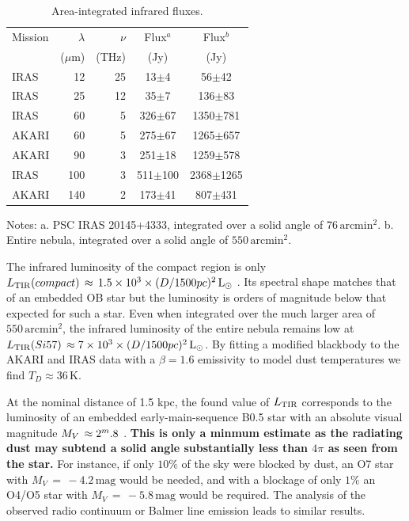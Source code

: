 \documentclass{aa}
\begin{document}
\begin{table}
\caption{Area-integrated infrared fluxes.}
   \label{table:IR_luminosities}
\begin{center}
\begin{tabular}{lrrcc}
\toprule
Mission& $\lambda$ & $\nu$ & Flux$^{a}$   & Flux$^{b}$    \\
       &($\mu$m)   & (THz) & (Jy)        & (Jy)          \\
\midrule
IRAS   &        12 &    25 &  13$\pm$4   &   56$\pm$42   \\
IRAS   &        25 &    12 &  35$\pm$7   &  136$\pm$83   \\
IRAS   &        60 &     5 & 326$\pm$67  & 1350$\pm$781  \\
AKARI  &        60 &     5 & 275$\pm$67  & 1265$\pm$657  \\
AKARI  &        90 &     3 & 251$\pm$18  & 1259$\pm$578  \\
IRAS   &       100 &     3 & 511$\pm$100 & 2368$\pm$1265 \\
AKARI  &       140 &     2 & 173$\pm$41  &  807$\pm$431  \\
\bottomrule
\end{tabular}
\end{center}
Notes: a. PSC IRAS 20145+4333, integrated over a solid angle of
$76\, \mathrm{arcmin^2}$.  b. Entire nebula, integrated over
a solid angle of $550\, \mathrm{arcmin^2}$.
\end{table}

The infrared luminosity of the compact region is only
$L_{\rm TIR}(compact)\,\approx\,1.5\times 10^{3}\times(D/1500
pc)^2\, \mathrm{L_{\odot}}$ \citep[using][]{Lee_1996}.
Its spectral shape matches that of an
embedded OB star \citep{wood1989massive} but the luminosity is
orders of magnitude below that expected for such a star. Even when 
integrated over the much larger area of $550\, \mathrm{arcmin^{2}}$, 
the infrared luminosity of the entire nebula remains low at
$L_{\rm TIR}(Si57)\,\approx 7\times 10^{3}\times(D/1500
pc)^2\,\mathrm{L_{\odot}}$. By fitting a
modified blackbody \citep{battersby2011characterizing} to the AKARI
and IRAS data with a $\beta=1.6$ emissivity to model dust temperatures 
we find $T_D \approx 36\, \mathrm{K}$.

At the nominal distance of 1.5 kpc, the found value of $L_{\rm TIR}$
corresponds to the luminosity of an embedded early-main-sequence B0.5
star with an absolute visual magnitude $M_V\,\approx\-2^m.8$
\citep{1973AJ.....78..929P}.  \textbf{This is only a minmum estimate
  as the radiating dust may subtend a solid angle
  substantially less than $4\pi$ as seen from the star.}
  For instance, if only $10\%$ of the sky were blocked by dust, an O7 star
  with $M_V\,=\,-4.2\, \mathrm{mag}$ would be needed, and with a
  blockage of only $1\%$ an O4/O5 star with
  $M_V\,=\,-5.8\, \mathrm{mag}$ would be required.  The analysis of
  the observed radio continuum or Balmer line emission leads to
  similar results.
\end{document}
